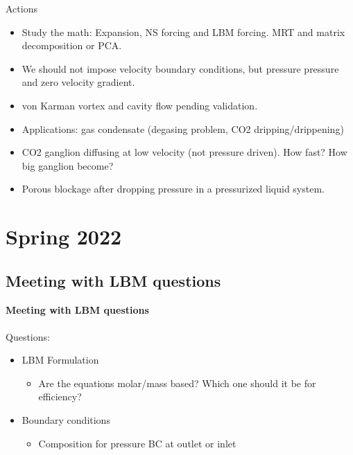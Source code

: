 \documentclass{beamer}
\begin{document}
	\begin{frame}{Actions}
		\begin{itemize}
			\item Study the math: Expansion, NS forcing and LBM forcing. MRT and matrix decomposition or PCA.
			\item We should not impose velocity boundary conditions, but pressure pressure and zero velocity gradient. 
			\item von Karman vortex and cavity flow pending validation.
			\item Applications: gas condensate (degasing problem, CO2 dripping/drippening)
			\item CO2 ganglion diffusing at low velocity (not pressure driven). How fast? How big ganglion become?
			\item Porous blockage after dropping pressure in a pressurized liquid system. 
		\end{itemize}
	\end{frame}
	
	
	\justifying
	\section{Spring 2022}
	
	\subsection{Meeting with LBM questions}
	\label{}
	\justifying
	\begin{frame}
		\textbf{Meeting with LBM questions}\\~\\
		Questions:
		\begin{itemize}
			\item LBM Formulation
			\begin{itemize}
				\item Are the equations molar/mass based? Which one should it be for efficiency?
			\end{itemize}
			\item Boundary conditions
			\begin{itemize}
				\item Composition for pressure BC at outlet or inlet
			\end{itemize}
		\end{itemize}
	\end{frame}
\end{document}
